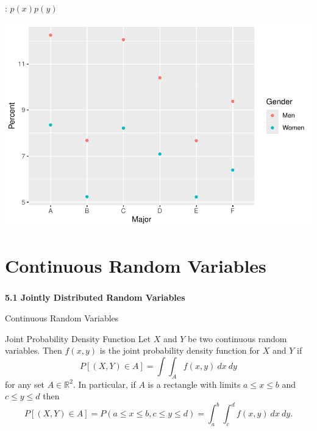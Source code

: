 \begin{frame}
  \begin{block}{\examplectd: $p(x)p(y)$}
    \begin{center}
      \includegraphics[height = .7\textheight]{figure/berkeley3-1}
    \end{center}
  \end{block}
\end{frame}

\section{Continuous Random Variables}

\begin{frame}
  \frametitle{}
  
  \begin{center}
    \Large{\textbf{5.1 Jointly Distributed Random Variables}}

    \bigskip

    \Large{Continuous Random Variables}
  \end{center}
  
\end{frame}

\begin{frame}
  \begin{block}{Joint Probability Density Function}
    Let $X$ and $Y$ be two continuous random variables. Then $f(x,y)$ is the joint probability density function for $X$ and $Y$ if
    \[
      P[(X,Y) \in A]=\int \int_A f(x,y)~dx~dy
    \]
    for any set $A \in \mathbb R^2$. In particular, if $A$ is a rectangle with limits $a \leq x \leq b$ and $c \leq y \leq d$ then 
    \[
    P[(X,Y) \in A]=P(a \leq x \leq b, c \leq y \leq d)= \int_a^b \int_c^d f(x,y)~dx~dy.
    \]
  \end{block}
\end{frame}

